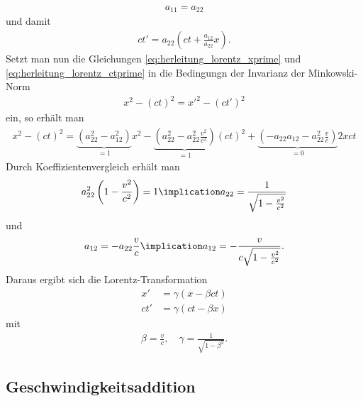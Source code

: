 \begin{align*}
    a_{11}=a_{22}
\end{align*}
und damit
\begin{align}
    \label{eq:herleitung_lorentz_ctprime}
    ct'=a_{22}\left(ct+\frac{a_{12}}{a_{22}}x\right). 
\end{align}
Setzt man nun die Gleichungen \eqref{eq:herleitung_lorentz_xprime} und \eqref{eq:herleitung_lorentz_ctprime} in die Bedingungn der Invarianz der Minkowski-Norm
\begin{align*}
    x^2-(ct)^2 = {x'}^2-(ct')^2
\end{align*}
ein, so erhält man
\begin{align*}
    x^2-(ct)^2 = \underbrace{\left(a_{22}^2-a_{12}^2\right)}_{=1}x^2 - \underbrace{\left(a_{22}^2-a_{22}^2 \frac{v^2}{c^2}\right)}_{=1}(ct)^2 + \underbrace{\left(-a_{22}a_{12}-a_{22}^2 \frac{v}{c}\right)}_{=0}2xct
\end{align*}
Durch Koeffizientenvergleich erhält man 
\begin{align*}
    a_{22}^2 \left(1-\frac{v^2}{c^2}\right) = 1 \implication a_{22} = \frac{1}{\sqrt{1-\frac{v^2}{c^2}}}
\end{align*}
und
\begin{align*}
    a_{12} = -a_{22} \frac{v}{c} \implication a_{12} = -\frac{v}{c \sqrt{1-\frac{v^2}{c^2}}}. 
\end{align*}
Daraus ergibt sich die Lorentz-Transformation
\begin{align*}
    x' &= \gamma(x-\beta ct) \\ 
    ct' &= \gamma(ct- \beta x) 
\end{align*}
mit 
\begin{align*}
    \beta=\frac{v}{c}, \quad \gamma=\frac{1}{\sqrt{1-\beta^2}}. 
\end{align*}

\subsection{Geschwindigkeitsaddition}

